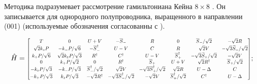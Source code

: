 \documentclass[../main.tex]{subfiles}
\newcommand{\kp}{k_{+}}
\newcommand{\km}{k_{-}}
\newcommand{\kz}{k_{z}}
\newcommand{\stp}{\overline{S}_{+}}
\newcommand{\stm}{\overline{S}_{-}}
\newcommand{\swp}{\widetilde{S}_{+}}
\newcommand{\swm}{\widetilde{S}_{-}}
\begin{document}
    Методика подразумевает рассмотрение гамильтониана Кейна $8 \times 8$ \cite{Kane:Band:1957}. 
    Он записывается для однородного полупроводника, выращенного в направлении (001) 
    (используемые обозначения согласованны с \cite{Novik:2005}).

    \begin{equation}
        \hat{H} =
            \rmatrix[0.7]{
                T       &   0     & U + V & -\stm & R &   0   & \stm / \sqrt{2}   & -\sqrt{2} R\\
                \sqrt{2} \kz P  & -\km P /\sqrt{6}  &   -\stm^\dagger   & U-V   &   C   &   R   & \sqrt{2} V & -\sqrt{3} \swm /\sqrt{2}\\
                \kp P /\sqrt{6} & \sqrt{2} \kz P /\sqrt{3}  & R^\dagger & C^\dagger & U - V & \stp^\dagger  & - \sqrt{3} \swp /\sqrt{2} & - \sqrt{2} V\\
                0   &   \kp P /\sqrt{2} & 0 & R^\dagger & \stp  & U+V   & \sqrt{2} R^\dagger    & \stp/\sqrt{2}\\
                -\kz P /\sqrt{3}    & - \km P / \sqrt{3}    & \stm^\dagger /\sqrt{2}    & \sqrt{2} V    & - \sqrt{3} \stp^\dagger /\sqrt{2} & \sqrt{2} R    & U - \Delta    & C\\
                -\kp P /\sqrt{3}    & \kz P /\sqrt{3}   & - \sqrt{2} R^\dagger  & -\sqrt{3} \stm^\dagger /\sqrt{2}  & -\sqrt{2} V   & \stp^\dagger /\sqrt{2}    & C^\dagger & U - \Delta
            };
    \end{equation}
\end{document}
